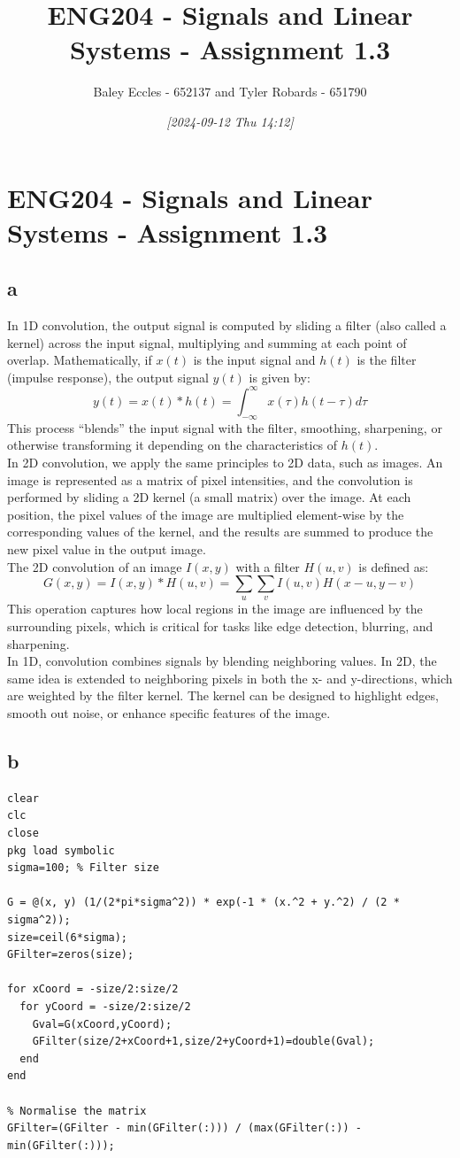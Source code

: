 \documentclass[11pt]{article}
\author{Baley Eccles - 652137 and Tyler Robards - 651790}
\date{\textit{{[}2024-09-12 Thu 14:12]}}
\title{ENG204 - Signals and Linear Systems - Assignment 1.3}
\begin{document}
\maketitle
\tableofcontents

\section{ENG204 - Signals and Linear Systems - Assignment 1.3}
\label{sec:org621d102}
\subsection{a}
\label{sec:org8cd8afc}
In 1D convolution, the output signal is computed by sliding a filter (also called a kernel) across the input signal, multiplying and summing at each point of overlap. Mathematically, if \(x(t)\) is the input signal and \(h(t)\) is the filter (impulse response), the output signal \(y(t)\) is given by:
\[y(t)=x(t)*h(t)=\int_{-\infty}^{\infty}x(\tau)h(t-\tau)d\tau\]
This process ``blends'' the input signal with the filter, smoothing, sharpening, or otherwise transforming it depending on the characteristics of \(h(t)\). \\
In 2D convolution, we apply the same principles to 2D data, such as images. An image is represented as a matrix of pixel intensities, and the convolution is performed by sliding a 2D kernel (a small matrix) over the image. At each position, the pixel values of the image are multiplied element-wise by the corresponding values of the kernel, and the results are summed to produce the new pixel value in the output image.\\
The 2D convolution of an image \(I(x,y)\) with a filter \(H(u,v)\) is defined as:
\[G(x,y)=I(x,y)*H(u,v)=\sum_u\sum_vI(u,v)H(x-u,y-v)\]
This operation captures how local regions in the image are influenced by the surrounding pixels, which is critical for tasks like edge detection, blurring, and sharpening.\\
In 1D, convolution combines signals by blending neighboring values. In 2D, the same idea is extended to neighboring pixels in both the x- and y-directions, which are weighted by the filter kernel. The kernel can be designed to highlight edges, smooth out noise, or enhance specific features of the image.
\subsection{b}
\label{sec:org5ae93b2}
\begin{verbatim}
clear
clc
close
pkg load symbolic
sigma=100; % Filter size

G = @(x, y) (1/(2*pi*sigma^2)) * exp(-1 * (x.^2 + y.^2) / (2 * sigma^2));
size=ceil(6*sigma);
GFilter=zeros(size);

for xCoord = -size/2:size/2
  for yCoord = -size/2:size/2
    Gval=G(xCoord,yCoord);
    GFilter(size/2+xCoord+1,size/2+yCoord+1)=double(Gval);
  end
end

% Normalise the matrix
GFilter=(GFilter - min(GFilter(:))) / (max(GFilter(:)) - min(GFilter(:)));

\end{verbatim}
\end{document}
